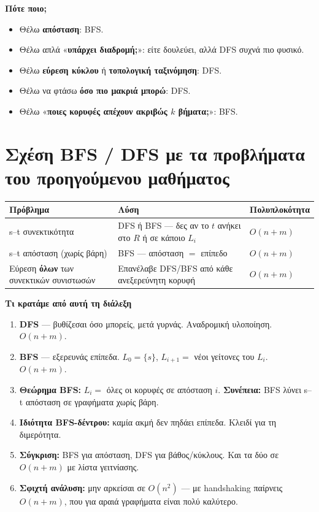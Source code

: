 \documentclass[11pt,a4paper]{article}
\begin{document}
\begin{intuition}
\textbf{Πότε ποιο;}
\begin{itemize}
  \item Θέλω \textbf{απόσταση}: BFS.
  \item Θέλω απλά «\textbf{υπάρχει διαδρομή;}»: είτε δουλεύει, αλλά DFS συχνά πιο
  φυσικό.
  \item Θέλω \textbf{εύρεση κύκλου} ή \textbf{τοπολογική ταξινόμηση}: DFS.
  \item Θέλω να φτάσω \textbf{όσο πιο μακριά μπορώ}: DFS.
  \item Θέλω «\textbf{ποιες κορυφές απέχουν ακριβώς $k$ βήματα;}»: BFS.
\end{itemize}
\end{intuition}

\section{Σχέση BFS / DFS με τα προβλήματα του προηγούμενου μαθήματος}

\begin{center}
\begin{tabular}{@{}p{4.6cm} p{6.2cm} l@{}}
\toprule
Πρόβλημα & Λύση & Πολυπλοκότητα \\
\midrule
s--t συνεκτικότητα & DFS ή BFS --- δες αν το $t$ ανήκει στο $R$ ή σε κάποιο
$L_i$ & $O(n + m)$ \\
s--t απόσταση (χωρίς βάρη) & BFS --- απόσταση $=$ επίπεδο & $O(n + m)$ \\
Εύρεση \textbf{όλων} των συνεκτικών συνιστωσών & Επανέλαβε DFS/BFS από κάθε
ανεξερεύνητη κορυφή & $O(n + m)$ \\
\bottomrule
\end{tabular}
\end{center}

\begin{recapbox}
\textbf{Τι κρατάμε από αυτή τη διάλεξη}
\begin{enumerate}
  \item \textbf{DFS} --- βυθίζεσαι όσο μπορείς, μετά γυρνάς. Αναδρομική
  υλοποίηση. $O(n+m)$.
  \item \textbf{BFS} --- εξερευνάς επίπεδα. $L_0 = \{s\}$, $L_{i+1} = $ νέοι
  γείτονες του $L_i$. $O(n+m)$.
  \item \textbf{Θεώρημα BFS:} $L_i = $ όλες οι κορυφές σε απόσταση $i$.
  \textbf{Συνέπεια:} BFS λύνει s--t απόσταση σε γραφήματα χωρίς βάρη.
  \item \textbf{Ιδιότητα BFS-δέντρου:} καμία ακμή δεν πηδάει επίπεδα. Κλειδί για
  τη διμερότητα.
  \item \textbf{Σύγκριση:} BFS για απόσταση, DFS για βάθος/κύκλους. Και τα δύο
  σε $O(n+m)$ με λίστα γειτνίασης.
  \item \textbf{Σφιχτή ανάλυση:} μην αρκείσαι σε $O(n^2)$ --- με handshaking
  παίρνεις $O(n+m)$, που για αραιά γραφήματα είναι πολύ καλύτερο.
\end{enumerate}
\end{recapbox}

\lecturefooter
\end{document}
